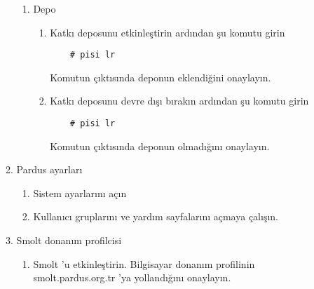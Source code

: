 \documentclass[a4paper,10pt]{article}
\begin{document}
\begin{enumerate}
\begin{enumerate}
        \begin{enumerate}
        \item Depo
            \begin{enumerate}
            \item Katkı deposunu etkinleştirin
                ardından şu komutu girin
\begin{verbatim}
    # pisi lr 
\end{verbatim}
                 Komutun çıktısında deponun eklendiğini onaylayın.
            \item Katkı deposunu devre dışı bırakın
                ardından şu komutu girin
\begin{verbatim}
    # pisi lr 
\end{verbatim}
                 Komutun çıktısında deponun olmadığını onaylayın.
            \end{enumerate}
        \end{enumerate}

    \item Pardus ayarları
        \begin{enumerate}
        \item Sistem ayarlarını açın
        \item Kullanıcı gruplarını ve yardım sayfalarını açmaya çalışın.
        \end{enumerate}

    \item Smolt donanım profilcisi
        \begin{enumerate}
        \item Smolt 'u etkinleştirin.
            Bilgisayar donanım profilinin smolt.pardus.org.tr 'ya yollandığını onaylayın.
        \end{enumerate}
    \end{enumerate}
\end{enumerate}
\end{document}
